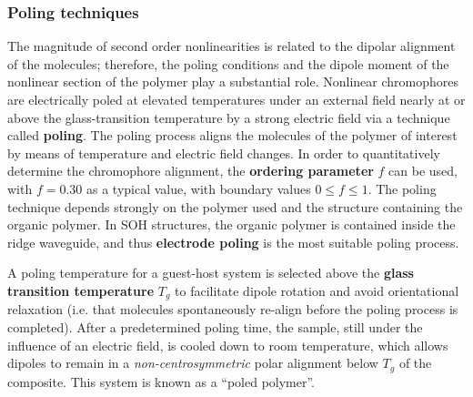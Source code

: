 
\subsubsection{Poling techniques}
\label{sec:thbkgd:poltechs}
%
The magnitude of second order nonlinearities is related to the dipolar alignment of the molecules; therefore, the poling conditions and the dipole moment of the nonlinear section of the polymer play a substantial role. Nonlinear chromophores are electrically poled at elevated temperatures under an external field nearly at or above the glass-transition temperature by a strong electric field via a technique called \textbf{poling}. The poling process aligns the molecules of the polymer of interest by means of temperature and electric field changes. In order to quantitatively determine the chromophore alignment, the \textbf{ordering parameter} $f$ can be used, with $f=0.30$ as a typical value, with boundary values $0\leqslant f \leqslant 1$\cite{singhmiyataNLOorganic96}. The poling technique depends strongly on the polymer used and the structure containing the organic polymer. In SOH structures, the organic polymer is contained inside the ridge waveguide, and thus \textbf{electrode poling} is the most suitable poling process. %


A poling temperature for a guest-host system is selected above the \textbf{glass transition temperature} $T_g$ to facilitate dipole rotation and avoid orientational relaxation (i.e. that molecules spontaneously re-align before the poling process is completed). After a predetermined poling time, the sample, still under the influence of an electric field, is cooled down to room temperature, which allows dipoles to remain in a \emph{non-centrosymmetric} polar alignment below  $T_g$ of the composite. This system is known as a ``poled polymer''. %

